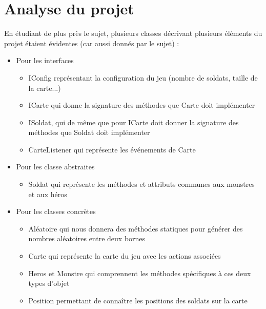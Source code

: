 \documentclass{article}
\begin{document}
\section{Analyse du projet}
En étudiant de plus près le sujet, plusieurs classes décrivant plusieurs éléments du projet étaient évidentes (car aussi donnés par le sujet) :
\begin{itemize}
  \item[\textbullet] \begin{bf}Pour les interfaces\end{bf}
        \begin{itemize}
         \item IConfig représentant la configuration du jeu (nombre de soldats, taille de la carte...)
         \item ICarte qui donne la signature des méthodes que Carte doit implémenter
         \item ISoldat, qui de même que pour ICarte doit donner la signature des méthodes que Soldat doit implémenter
         \item CarteListener qui représente les événements de Carte
        \end{itemize}
  \item[\textbullet] \begin{bf}Pour les classe abstraites\end{bf}
        \begin{itemize}
         \item Soldat qui représente les méthodes et attributs communes aux monstres et aux héros
        \end{itemize}
  \item[\textbullet] \begin{bf}Pour les classes concrètes\end{bf}
        \begin{itemize}
         \item Aléatoire qui nous donnera des méthodes statiques pour générer des nombres aléatoires entre deux bornes
         \item Carte qui représente la carte du jeu avec les actions associées
         \item Heros et Monstre qui comprennent les méthodes spécifiques à ces deux types d'objet
         \item Position permettant de connaître les positions des soldats sur la carte
        \end{itemize}
\end{itemize}
\end{document}
